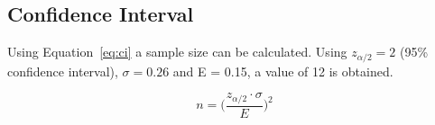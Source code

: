\documentclass[a4paper]{article}
\begin{document}
\subsection{Confidence Interval} %
\label{sub:confidence_interval}

Using Equation~\ref{eq:ci} a sample size can be calculated. Using
$z_{\alpha/2} = 2$ (95\% confidence interval), $\sigma = 0.26$  and E = 0.15,
a value of 12 is obtained.

\begin{equation}
  n = \Big( \frac{z_{\alpha/2} \cdot \sigma}{E} \Big) ^2
\label{eq:ci}
\end{equation}


\custombibliography{}
\end{document}
